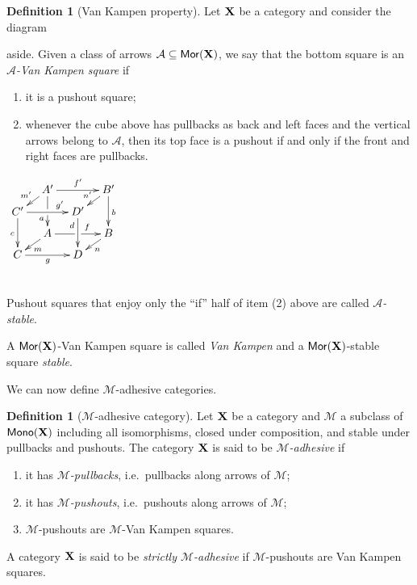 \documentclass[runningheads,envcountsect]{llncs}
\theoremstyle{plain}
\theoremstyle{definition}
\newtheorem{definition}[theorem]{Definition}
\def\C{\textbf {\textup{C}}}
\def\X{\textbf {\textup{X}}}
\newcommand{\mor}{\mathsf{Mor}}
\newcommand{\mon}{\mathsf{Mono}}
\begin{document}
\begin{definition}[Van Kampen property]
	Let $\X$ be a category and consider the diagram\\
	\parbox{10cm}{
		aside.
		Given  a class of arrows $\mathcal{A}\subseteq \mor(\X)$, we say that the bottom square
		is an \emph{$\mathcal{A}$-Van Kampen square} if
		\begin{enumerate}
			\item it is a pushout square;
			\item 	whenever the cube above has pullbacks as back and left faces and the vertical arrows belong to $\mathcal{A}$, then its top face is a pushout 
			if and only if the front and right faces are pullbacks.
	\end{enumerate}}
	\parbox{2cm}{$\xymatrix@C=10pt@R=6pt{&A'\ar[dd]|\hole_(.65){a}\ar[rr]^{f'} \ar[dl]_{m'} && B' \ar[dd]^{b} \ar[dl]_{n'} \\ C'  \ar[dd]_{c}\ar[rr]^(.7){g'} & & D' \ar[dd]_(.3){d}\\&A\ar[rr]|\hole^(.65){f} \ar[dl]^{m} && B \ar[dl]^{n} \\C \ar[rr]_{g} & & D }$ }\\
	Pushout squares that enjoy only the ``if'' half of item (2) above are called \emph{$\mathcal{A}$-stable}.
	
	A $\mor(\X)$-Van Kampen square is called  \emph{Van
		Kampen} and a $\mor(\X)$-stable square  \emph{stable}.
\end{definition}

We can now define $\mathcal{M}$-adhesive categories.

\begin{definition}[$\mathcal{M}$-adhesive category]
	Let $\X$ be a category and $\mathcal{M}$ a subclass of
	$\mon(\X)$  including  all isomorphisms, closed under composition,  and stable under pullbacks and pushouts.  The category  $\X$ is said to be \emph{$\mathcal{M}$-adhesive} if
	\begin{enumerate}
		\item it has \emph{$\mathcal{M}$-pullbacks}, i.e.~pullbacks along arrows of $\mathcal{M}$;
		\item it has \emph{$\mathcal{M}$-pushouts}, i.e.~pushouts along arrows of $\mathcal{M}$;
		\item  $\mathcal{M}$-pushouts are $\mathcal{M}$-Van Kampen squares.
	\end{enumerate}
	
	A category $\X$ is said to be \emph{strictly $\mathcal{M}$-adhesive}
	if $\mathcal{M}$-pushouts are Van Kampen squares.
\end{definition}
\end{document}
